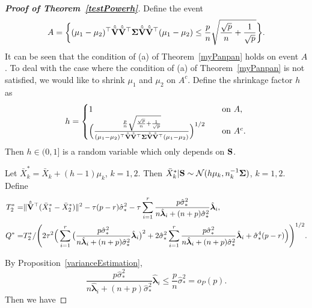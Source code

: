 \documentclass[times,sort&compress,3p]{elsarticle}
\newcommand{\bfsym}[1]{\ensuremath{\boldsymbol{#1}}}
\def\blambda {\bfsym {\lambda}}        \def\bLambda {\bfsym {\Lambda}}
\theoremstyle{plain}
\theoremstyle{definition}
\theoremstyle{remark}
\begin{document}
\begin{appendices}
\begin{proof}[\textbf{Proof of Theorem~\ref{testPowerh}}]
    Define the event
    $$
    A=\bigg\{
            (\mu_1-\mu_2)^\top  \hat{\tilde{\BV}}\hat{\tilde{\BV}}^\top  \bSigma \hat{\tilde{\BV}}\hat{\tilde{\BV}}^\top (\mu_1-\mu_2)\leq
            \frac{p}{n}\sqrt{\frac{\sqrt{p}}{n}+\frac{1}{\sqrt{p}}}
        \bigg\}.
    $$
    It can be seen that the condition of (a) of Theorem~\ref{myPanpan} holds on event $A$.
    To deal with the case where the condition of (a) of Theorem~\ref{myPanpan} is not satisfied, we would like to shrink $\mu_1$ and $\mu_2$ on $A^c$.
    Define the shrinkage factor $h$ as
$$
    h=
        \begin{cases}
            1&\quad \text{on }  A,\\
            \Big( 
            \frac{
\frac{p}{n}\sqrt{\frac{\sqrt{p}}{n}+\frac{1}{\sqrt{p}}}
            }{(\mu_1-\mu_2)^\top  \hat{\tilde{\BV}}\hat{\tilde{\BV}}^\top  \bSigma \hat{\tilde{\BV}}\hat{\tilde{\BV}}^\top (\mu_1-\mu_2) }
            \Big)^{1/2}
            &\quad \text{on }
            A^c
            .\\
        \end{cases}
$$
    Then $h\in (0,1]$ is a random variable which only depends on $\mathbf{S}$. 


    Let $\bar{X}_{k}^*=\bar{X}_k+(h-1)\mu_k$, $k=1,2$. Then $\bar{X}_k^*|\BS\sim \mathcal{N}(h\mu_k,n_k^{-1}\bSigma)$, $k=1,2$.
    Define
    \begin{align*}
        T_2^*=&\|\hat{\tilde{\BV}}^\top  (\bar{X}_1^*-\bar{X}_2^*)\|^2
-
\tau(p-r)\hat{\sigma}_*^2 
- \tau\sum_{i=1}^r \frac{p\hat{\sigma}_*^2}{n\hat{\blambda}_i+(n+p)\hat{\sigma}_*^2}\hat{\blambda}_i,\\
        Q^*=&
T_2^*/
   \Bigg( 
        2\tau^2\Big(
        \sum_{i=1}^r \big(\frac{p\hat{\sigma}_*^2}{n\hat{\blambda}_i+(n+p)\hat{\sigma}_*^2}\hat{\blambda}_i\big)^2
    +
        2\hat{\sigma}_*^2\sum_{i=1}^r \frac{p\hat{\sigma}_*^2}{n\hat{\blambda}_i+(n+p)\hat{\sigma}_*^2}\hat{\blambda}_i
        +\hat{\sigma}_*^4 (p-r)
    \Big)\Bigg)^{1/2}.
    \end{align*}

By Proposition~\ref{varianceEstimation},
$$
\frac{p\hat{\sigma}_*^2}{n\hat{\blambda}_i+(n+p)\hat{\sigma}_*^2}\hat{\blambda}_i\leq
\frac{p}{n}\hat{\sigma}_*^2
=o_P(p).
$$
Then we have 


\end{proof}
\end{appendices}
\end{document}
